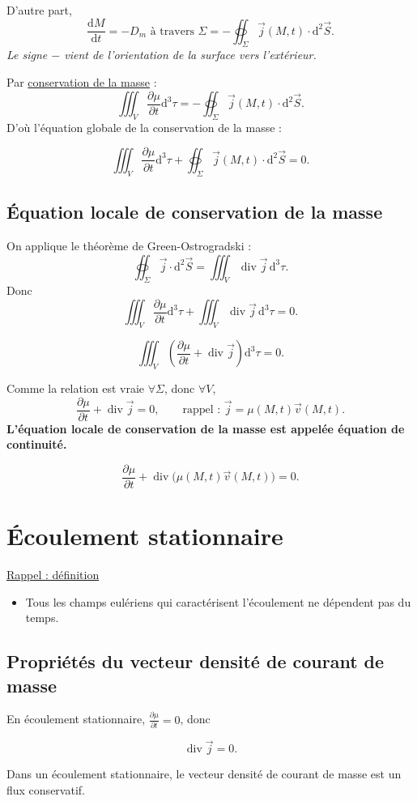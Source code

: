 \documentclass[11pt,a4paper]{article}
\newcommand{\dd}{\mathrm d}
\newcommand{\vv}{\vec v}
\newcommand{\JJ}{\vec{j}}
\newcommand{\ddiv}{\operatorname{div}}
\newcommand{\pd}[2]{\frac{\partial #1}{\partial #2}}
\begin{document}
D'autre part,
\[
\frac{\dd M}{\dd t}=-D_m\text{ à travers }\Sigma
=-\oiint_\Sigma\JJ(M,t)\cdot\dd^2\vec S.
\]
\textit{Le signe $-$ vient de l’orientation de la surface vers l'extérieur.}

Par \underline{conservation de la masse} :
\[\iiint_V\pd{\mu}{t}\dd^3\tau=-\oiint_\Sigma\JJ(M,t)\cdot\dd^2\vec S.\]
D'où l'équation globale de la conservation de la masse :
\begin{cadre}\[\iiint_V\pd{\mu}{t}\dd^3\tau+\oiint_\Sigma\JJ(M,t)\cdot\dd^2\vec S=0.\]\end{cadre}
\subsection{Équation locale de conservation de la masse}
On applique le théorème de Green-Ostrogradski :
\[\oiint_\Sigma\JJ\cdot\dd^2\vec S=\iiint_V\ddiv\JJ\,\dd^3\tau.\]
Donc
\[\iiint_V\pd{\mu}{t}\dd^3\tau+\iiint_V\ddiv\JJ\,\dd^3\tau=0.\]
\begin{cadre}\[\iiint_V\left(\pd{\mu}{t}+\ddiv\JJ\right)\dd^3\tau=0.\]\end{cadre}
Comme la relation est vraie $\forall\Sigma$, donc $\forall V$,
\[\pd{\mu}{t}+\ddiv\JJ=0,\qquad\text{rappel : }\JJ=\mu(M,t)\vv(M,t).\]
\textbf{L’équation locale de conservation de la masse est appelée équation de continuité.}
\begin{cadre}[etoiles={*****}]\[\pd{\mu}{t}+\ddiv\bigl(\mu(M,t)\vv(M,t)\bigr)=0.\]\end{cadre}

\section{Écoulement stationnaire}
\underline{Rappel : définition}
\begin{itemize}\item Tous les champs eulériens qui caractérisent l'écoulement ne dépendent pas du temps.\end{itemize}
\subsection{Propriétés du vecteur densité de courant de masse}
En écoulement stationnaire, $\pd{\mu}{t}=0$, donc
\begin{cadre}\[\ddiv\JJ=0.\]\end{cadre}
Dans un écoulement stationnaire, le vecteur densité de courant de masse est un flux conservatif.
\end{document}
